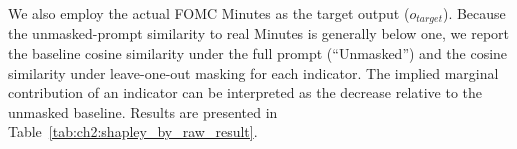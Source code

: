 We also employ the actual FOMC Minutes as the target output ($o_{target}$). Because the unmasked-prompt similarity to real Minutes is generally below one, we report the baseline cosine similarity under the full prompt (``Unmasked'') and the cosine similarity under leave-one-out masking for each indicator. The implied marginal contribution of an indicator can be interpreted as the decrease relative to the unmasked baseline. Results are presented in Table~\ref{tab:ch2:shapley_by_raw_result}.

